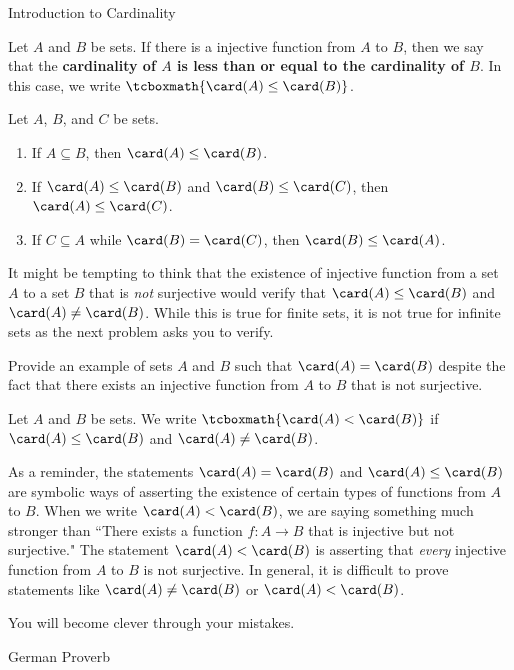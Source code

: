 \begin{section}{Introduction to Cardinality}
\begin{definition}
Let $A$ and $B$ be sets. If there is a injective function from $A$ to $B$, then we say that the \textbf{cardinality of $A$ is less than or equal to the cardinality of $B$}. In this case, we write $\tcboxmath{\card(A)\leq\card(B)}$.
\end{definition}

\begin{theorem}
Let $A$, $B$, and $C$ be sets.
\begin{enumerate}[label=\textrm{(\alph*)}]
\item If $A\subseteq B$, then $\card(A)\leq \card(B)$.
\item If $\card(A)\leq \card(B)$ and $\card(B)\leq \card(C)$, then $\card(A)\leq \card(C)$.
\item If $C\subseteq A$ while $\card(B)=\card(C)$, then $\card(B)\leq \card(A)$.
\end{enumerate}
\end{theorem}

It might be tempting to think that the existence of injective function from a set $A$ to a set $B$ that is \emph{not} surjective would verify that $\card(A)\leq \card(B)$ and $\card(A)\neq \card(B)$. While this is true for finite sets, it is not true for infinite sets as the next problem asks you to verify.

\begin{problem}
Provide an example of sets $A$ and $B$ such that $\card(A)=\card(B)$ despite the fact that there exists an injective function from $A$ to $B$ that is not surjective.
\end{problem}

\begin{definition}
Let $A$ and $B$ be sets. We write $\tcboxmath{\card(A)< \card(B)}$ if $\card(A)\leq \card(B)$ and $\card(A)\neq \card(B)$.
\end{definition}

As a reminder, the statements $\card(A)= \card(B)$ and $\card(A)\leq \card(B)$ are symbolic ways of asserting the existence of certain types of functions from $A$ to $B$. When we write $\card(A)<\card(B)$, we are saying something much stronger than ``There exists a function $f:A\to B$ that is injective but not surjective." The statement $\card(A)<\card(B)$ is asserting that \emph{every} injective function from $A$ to $B$ is not surjective. In general, it is difficult to prove statements like $\card(A)\neq \card(B)$ or $\card(A)<\card(B)$.

\epigraph{You will become clever through your mistakes.}{German Proverb}

\end{section}